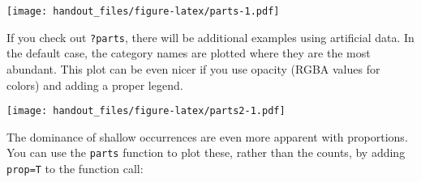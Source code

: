 \documentclass[]{article}
\newenvironment{Shaded}{\begin{snugshade}}{\end{snugshade}}
\newcommand{\KeywordTok}[1]{\textcolor[rgb]{0.13,0.29,0.53}{\textbf{{#1}}}}
\newcommand{\DataTypeTok}[1]{\textcolor[rgb]{0.13,0.29,0.53}{{#1}}}
\newcommand{\DecValTok}[1]{\textcolor[rgb]{0.00,0.00,0.81}{{#1}}}
\newcommand{\FloatTok}[1]{\textcolor[rgb]{0.00,0.00,0.81}{{#1}}}
\newcommand{\StringTok}[1]{\textcolor[rgb]{0.31,0.60,0.02}{{#1}}}
\newcommand{\CommentTok}[1]{\textcolor[rgb]{0.56,0.35,0.01}{\textit{{#1}}}}
\newcommand{\NormalTok}[1]{{#1}}
\begin{document}
\texttt{[image: handout\_files/figure-latex/parts-1.pdf]}

If you check out \texttt{?parts}, there will be additional examples
using artificial data. In the default case, the category names are
plotted where they are the most abundant. This plot can be even nicer if
you use opacity (RGBA values for colors) and adding a proper legend.

\begin{Shaded}
\end{Shaded}

\texttt{[image: handout\_files/figure-latex/parts2-1.pdf]}

The dominance of shallow occurrences are even more apparent with
proportions. You can use the \texttt{parts} function to plot these,
rather than the counts, by adding \texttt{prop=T} to the function call:
\end{document}
